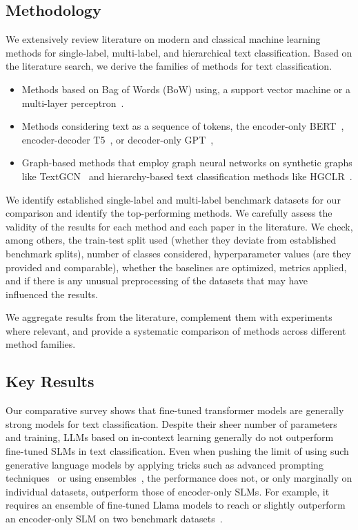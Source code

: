 \documentclass[lettersize,journal]{IEEEtran}
\newcommand{\GenLMs}{generative language models\xspace}
\newcommand{\SLM}{SLM\xspace}
\newcommand{\SLMs}{SLMs\xspace}
\newcommand{\LLMs}{LLMs\xspace}
\begin{document}
\subsection{Methodology}

We extensively review literature on modern and classical machine learning methods for single-label, multi-label, and hierarchical text classification.
Based on the literature search, we derive the families of methods for text classification. 

\begin{itemize}
\item Methods based on Bag of Words (BoW) using, \eg a support vector machine or a multi-layer perceptron~\cite{galkescherp-acl2022}.

\item Methods considering text as a sequence of tokens, \eg the encoder-only BERT~\cite{DBLP:conf/naacl/DevlinCLT19}, encoder-decoder T5~\cite{T5}, or decoder-only GPT~\cite{DBLP:conf/nips/BrownMRSKDNSSAA20}, 

\item Graph-based methods that employ graph neural networks on synthetic graphs like TextGCN~\cite{DBLP:conf/aaai/YaoM019} and hierarchy-based text classification methods like HGCLR~\cite{DBLP:conf/acl/WangWH0W22}.
\end{itemize}

We identify established single-label and multi-label benchmark datasets for our comparison and identify the top-performing methods.
We carefully assess the validity of the results for each method and each paper in the literature.
We check, among others, the train-test split used (whether they deviate from established benchmark splits), 
number of classes considered, 
hyperparameter values (are they provided and comparable), 
whether the baselines are optimized, 
metrics applied, 
and if there is any unusual preprocessing of the datasets that may have influenced the results.  

We aggregate results from the literature, complement them with experiments where relevant, and provide a systematic comparison of methods across different method families.

\subsection{Key Results}
Our comparative survey shows that fine-tuned transformer models are generally strong models for text classification. 
Despite their sheer number of parameters and training, \LLMs based on in-context learning generally do not outperform fine-tuned \SLMs in text classification.
Even when pushing the limit of using such \GenLMs by applying tricks such as advanced prompting techniques~\cite{carp} or using ensembles~\cite{pushing-the-limit-11346014-rgpt}, the performance does not, or only marginally on individual datasets, outperform those of encoder-only \SLMs. 
For example, it requires an ensemble of fine-tuned Llama models to reach or slightly outperform an encoder-only \SLM on two benchmark datasets~\cite{pushing-the-limit-11346014-rgpt}.
\end{document}

